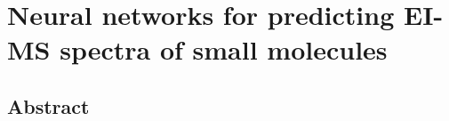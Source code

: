 \chapter{Neural networks for predicting EI-MS spectra of small molecules}
\thispagestyle{plain}
\vspace{-.5cm}

\section*{Abstract}
    \dsp
    


